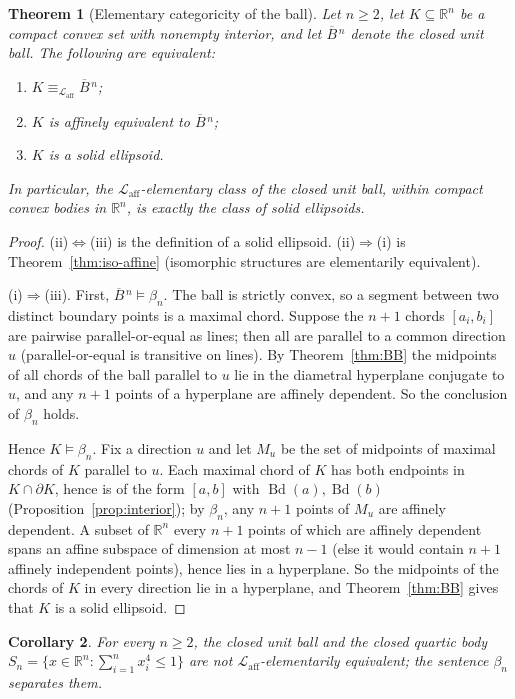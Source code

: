 \documentclass[11pt]{amsart}
\newtheorem{theorem}{Theorem}[section]
\newtheorem{corollary}[theorem]{Corollary}
\theoremstyle{definition}
\newcommand{\R}{\mathbb{R}}
\newcommand{\Laff}{\mathcal{L}_{\mathrm{aff}}}
\newcommand{\Bd}{\operatorname{Bd}}
\newcommand{\Ball}{\overline{B}{}^{\,n}}
\begin{document}
\begin{theorem}[Elementary categoricity of the ball]
\label{thm:ball}
Let $n\ge2$, let $K\subseteq\R^n$ be a compact convex set with nonempty
interior, and let $\Ball$ denote the closed unit ball. The following are
equivalent:
\begin{enumerate}[label=\textup{(\roman*)}]
\item $K\equiv_{\Laff}\Ball$;
\item $K$ is affinely equivalent to $\Ball$;
\item $K$ is a solid ellipsoid.
\end{enumerate}
In particular, the $\Laff$-elementary class of the closed unit ball, within
compact convex bodies in $\R^n$, is exactly the class of solid ellipsoids.
\end{theorem}

\begin{proof}
(ii)$\Leftrightarrow$(iii) is the definition of a solid ellipsoid.
(ii)$\Rightarrow$(i) is Theorem~\ref{thm:iso-affine} (isomorphic structures
are elementarily equivalent).

(i)$\Rightarrow$(iii). First, $\Ball\models\beta_n$. The ball is strictly
convex, so a segment between two distinct boundary points is a maximal
chord. Suppose the $n+1$ chords $[a_i,b_i]$ are pairwise parallel-or-equal
as lines; then all are parallel to a common direction $u$ (parallel-or-equal
is transitive on lines). By Theorem~\ref{thm:BB} the midpoints of all chords
of the ball parallel to $u$ lie in the diametral hyperplane conjugate to
$u$, and any $n+1$ points of a hyperplane are affinely dependent. So the
conclusion of $\beta_n$ holds.

Hence $K\models\beta_n$. Fix a direction $u$ and let $M_u$ be the set of
midpoints of maximal chords of $K$ parallel to $u$. Each maximal chord of
$K$ has both endpoints in $K\cap\partial K$, hence is of the form
$[a,b]$ with $\Bd(a),\Bd(b)$ (Proposition~\ref{prop:interior}); by
$\beta_n$, any $n+1$ points of $M_u$ are affinely dependent. A subset of
$\R^n$ every $n+1$ points of which are affinely dependent spans an affine
subspace of dimension at most $n-1$ (else it would contain $n+1$ affinely
independent points), hence lies in a hyperplane. So the midpoints of the
chords of $K$ in every direction lie in a hyperplane, and
Theorem~\ref{thm:BB} gives that $K$ is a solid ellipsoid.
\end{proof}

\begin{corollary}\label{cor:ballquarticaff}
For every $n\ge2$, the closed unit ball and the closed quartic body
$S_n=\{x\in\R^n:\sum_{i=1}^n x_i^4\le1\}$ are not $\Laff$-elementarily
equivalent; the sentence $\beta_n$ separates them.
\end{corollary}
\end{document}
